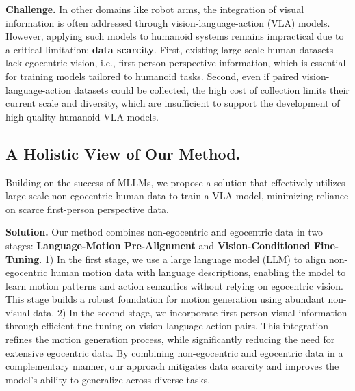 \textbf{Challenge. } 
In other domains like robot arms, the integration of visual information is often addressed through vision-language-action (VLA) models.
However, applying such models to humanoid systems remains impractical due to a critical limitation: \textbf{data scarcity}. First, existing large-scale human datasets lack egocentric vision, i.e., first-person perspective information, which is essential for training models tailored to humanoid tasks. 
Second, even if paired vision-language-action datasets could be collected, the high cost of collection limits their current scale and diversity, which are insufficient to support the development of high-quality humanoid VLA models.


\subsection{A Holistic View of Our Method. } 

Building on the success of MLLMs, we propose a solution that effectively utilizes large-scale non-egocentric human data to train a VLA model, minimizing reliance on scarce first-person perspective data.

\textbf{Solution. } 
Our method combines non-egocentric and egocentric data in two stages: \textbf{Language-Motion Pre-Alignment} and \textbf{Vision-Conditioned Fine-Tuning}.
1) In the first stage, we use a large language model (LLM) to align non-egocentric human motion data with language descriptions, enabling the model to learn motion patterns and action semantics without relying on egocentric vision. This stage builds a robust foundation for motion generation using abundant non-visual data.
2) In the second stage, we incorporate first-person visual information through efficient fine-tuning on vision-language-action pairs. This integration refines the motion generation process, while significantly reducing the need for extensive egocentric data.
By combining non-egocentric and egocentric data in a complementary manner, our approach mitigates data scarcity and improves the model’s ability to generalize across diverse tasks.

